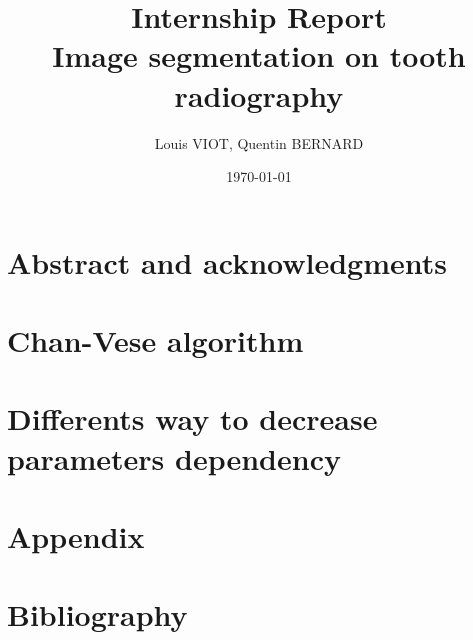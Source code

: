 \documentclass[a4paper,12pt]{article}
\title{\textbf{Internship Report \\ Image segmentation on tooth radiography}}
\author{Louis VIOT, Quentin BERNARD}
\date\today
\begin{document}
\maketitle
\tableofcontents
\newpage
\section{Abstract and acknowledgments}

\newpage
\section{Chan-Vese algorithm}

\newpage
\section{Differents way to decrease parameters dependency}

\newpage
\section{Appendix}

\newpage
\section{Bibliography}

\end{document}
